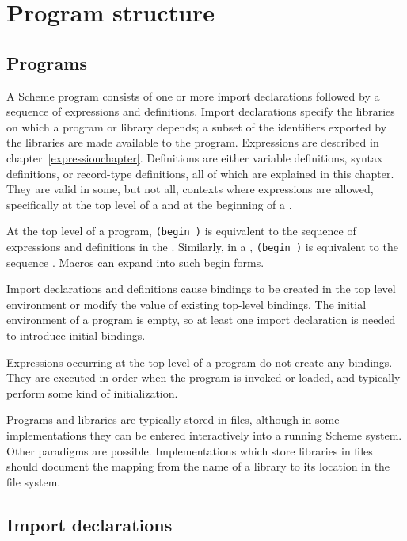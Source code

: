\chapter{Program structure}
\label{programchapter}

\section{Programs}

A Scheme program consists of  
one or more import declarations followed by a sequence of
expressions and definitions.
Import declarations specify the libraries on which a program or library depends;
a subset of the identifiers exported by the libraries are made available to
the program.
Expressions are described in chapter~\ref{expressionchapter}.
Definitions are either variable definitions, syntax definitions, or
record-type definitions, all of which are explained in this chapter.
They are valid in some, but not all, contexts where expressions
are allowed, specifically at the top level of a 
and at the beginning of a .

At the top level of a program, {\tt(begin  \dotsfoo)} is
equivalent to the sequence of expressions and definitions
in the .   
Similarly, in a , {\tt(begin  \dotsfoo)} is equivalent
to the sequence  \dotsfoo.
Macros can expand into such {\cf begin} forms.

Import declarations and definitions
cause bindings to be created in the top level
environment or modify the value of existing top-level bindings.
The initial environment of a program is empty,
so at least one import declaration is needed to introduce initial bindings.

Expressions occurring at the top level of a program
do not create any bindings.  They are
executed in order when the program is
invoked or loaded, and typically perform some kind of initialization.


Programs and libraries are typically stored in files, although
in some implementations they can be entered interactively into a running
Scheme system.  Other paradigms are possible.
Implementations which store libraries in files should document the
mapping from the name of a library to its location in the file system.

\section{Import declarations}

